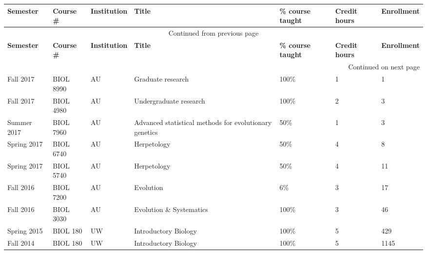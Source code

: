 \begin{longtable}[l]{ @{} p{0.7in} p{0.7in} p{0.7in} p{1.5in} p{0.7in} p{0.4in} p{0.8in} @{} }
    \hline
    \textbf{Semester} & \textbf{Course \#} & \textbf{Institution} & \textbf{Title} & \textbf{\% course taught} & \textbf{Credit hours} & \textbf{Enrollment} \\
    \hline
    \endfirsthead
    \multicolumn{7}{c}{{Continued from previous page}} \\
    \hline
    \textbf{Semester} & \textbf{Course \#} & \textbf{Institution} & \textbf{Title} & \textbf{\% course taught} & \textbf{Credit hours} & \textbf{Enrollment} \\
    \hline
    \endhead
    \hline \multicolumn{7}{|r|}{{Continued on next page}} \\
    \endfoot
    \hline
    \endlastfoot
    Fall 2017 & BIOL 8990 & AU & Graduate research & 100\% & 1 & 1 \\ 
    Fall 2017 & BIOL 4980 & AU & Undergraduate research & 100\% & 2 & 3 \\ 
    Summer 2017 & BIOL 7960 & AU & Advanced statistical methods for evolutionary genetics & 50\% & 1 & 3 \\
    Spring 2017 & BIOL 6740 & AU & Herpetology & 50\% & 4 & 8 \\
    Spring 2017 & BIOL 5740 & AU & Herpetology & 50\% & 4 & 11 \\
    Fall 2016 & BIOL 7200 & AU & Evolution & 6\% & 3 & 17 \\
    Fall 2016 & BIOL 3030 & AU & Evolution \& Systematics & 100\% & 3 & 46 \\
    Spring 2015 & BIOL 180 & UW & Introductory Biology & 100\% & 5 & 429 \\
    Fall 2014 & BIOL 180 & UW & Introductory Biology & 100\% & 5 & 1145 \\
\end{longtable}
